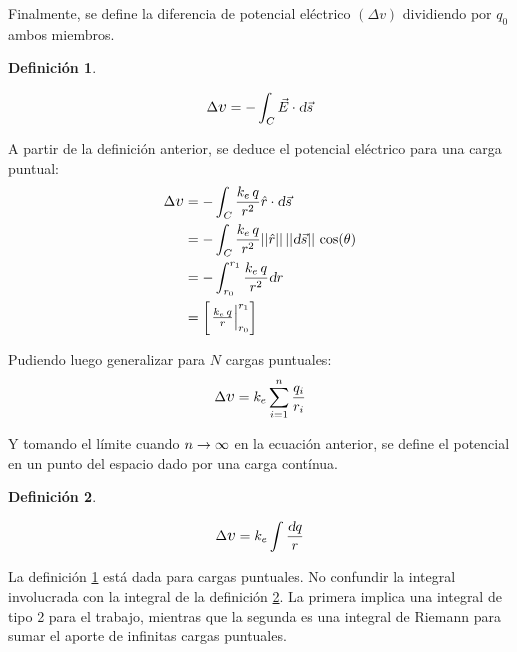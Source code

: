 \documentclass[a5paper,12pt,twoside]{book}
\newtheorem{defn}{{Definición}}[chapter]
\begin{document}
Finalmente, se define la diferencia de potencial eléctrico $(\Delta v)$ dividiendo por $q_0$ ambos miembros.

\begin{mdframed}[style=MyFrame1]
    \begin{defn}
        \label{defn:potEle}
    \end{defn}
    \begin{equation*}
        \Delta \V = - \int_C \vec{E} \cdot \dif \vec{s}
    \end{equation*}
\end{mdframed}

A partir de la definición anterior, se deduce el potencial eléctrico para una carga puntual:
\begin{align*}
    \Delta \V &= - \int_C \frac{\cstcoulomb \, q}{r^2} \versor{r} \cdot \dif \Vec{s}
    \\
    &= - \int_C \frac{\cstcoulomb \, q}{r^2} \nnorm{\versor{r}} \, \nnorm{\dif \Vec{s}} \, \cos(\theta)
    \\
    &= - \int_{r_0}^{r_1} \frac{\cstcoulomb \, q}{r^2} \dif r
    \\
    &= \barrow{\frac{\cstcoulomb \, q}{r}}{r_0}{r_1}
\end{align*}

Pudiendo luego generalizar para $N$ cargas puntuales:
\begin{equation}
    \Delta \V = \cstcoulomb \sum_{\ith=1}^\nth \frac{q_\ith}{r_\ith}
\end{equation}

Y tomando el límite cuando $n\to\infty$ en la ecuación anterior, se define el potencial en un punto del espacio dado por una carga contínua.

\begin{mdframed}[style=MyFrame1]
    \begin{defn}
        \label{defn:potCargaCont}
    \end{defn}
    \begin{equation*}
        \Delta \V = \cstcoulomb \int \frac{\dif q}{r}
    \end{equation*}
\end{mdframed}

La definición \ref{defn:potEle} está dada para cargas puntuales.
No confundir la integral involucrada con la integral de la definición \ref{defn:potCargaCont}.
La primera implica una integral de tipo 2 para el trabajo, mientras que la segunda es una integral de Riemann para sumar el aporte de infinitas cargas puntuales.
\end{document}
